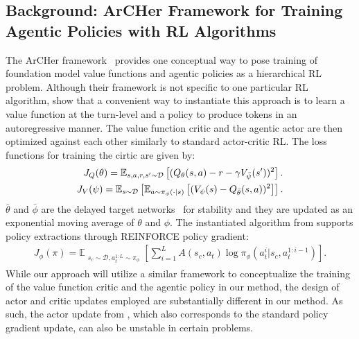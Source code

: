 \subsection{Background: ArCHer Framework for Training Agentic Policies with RL Algorithms} \label{sec:method-archer}
\vspace{-0.1cm}
The ArCHer framework~\citep{zhou2024archertraininglanguagemodel} provides one conceptual way to pose training of foundation model value functions and agentic policies as a hierarchical RL problem. Although their framework is not specific to one particular RL algorithm, \citet{zhou2024archertraininglanguagemodel} show that a convenient way to instantiate this approach is to learn a value function at the turn-level and a policy to produce tokens in an autoregressive manner. The value function critic and the agentic actor are then optimized against each other similarly to standard actor-critic RL. The loss functions for training the cirtic are given by: 
\begin{align}
    J_Q(\theta) = \mathbb{E}_{s, a, r, s' \sim \mathcal{D}}\left[(Q_\theta(s,a) -r - \gamma V_{\bar{\psi}}(s'))^2\right]. & \label{equation: JQ}\\
    J_V(\psi) = \mathbb{E}_{s \sim \mathcal{D}}\left[\mathbb{E}_{a \sim \pi_\phi(\cdot|s)}\left[(V_\psi(s) - Q_{\bar{\theta}}(s,a))^2\right]\right]. & \label{equation: JV}
\end{align}
$\bar{\theta}$ and $\bar{\phi}$ are the delayed target networks~\citep{mnih2013playingatarideepreinforcement} for stability and they are updated as an exponential moving average of $\theta$ and $\phi$. The instantiated algorithm from \citet{zhou2024archertraininglanguagemodel} supports policy extractions through REINFORCE policy gradient:
\begin{align*}   
          J_\phi(\pi) = \mathbb{E}_{\substack{s_{c} \sim \mathcal{D}, a_t^{1:L} \sim \pi_\phi}}\!\!\left[\sum_{i=1}^L A(s_{c}, a_t) \log \pi_{\phi}(a_t^i| s_{c}, a_t^{1:i-1}) \right].
\end{align*}
While our approach will utilize a similar framework to conceptualize the training of the value function critic and the agentic policy in our method, the design of actor and critic updates employed are substantially different in our method. As such, the actor update from \citet{zhou2024archertraininglanguagemodel}, which also corresponds to the standard policy gradient update, can also be unstable in certain problems.



